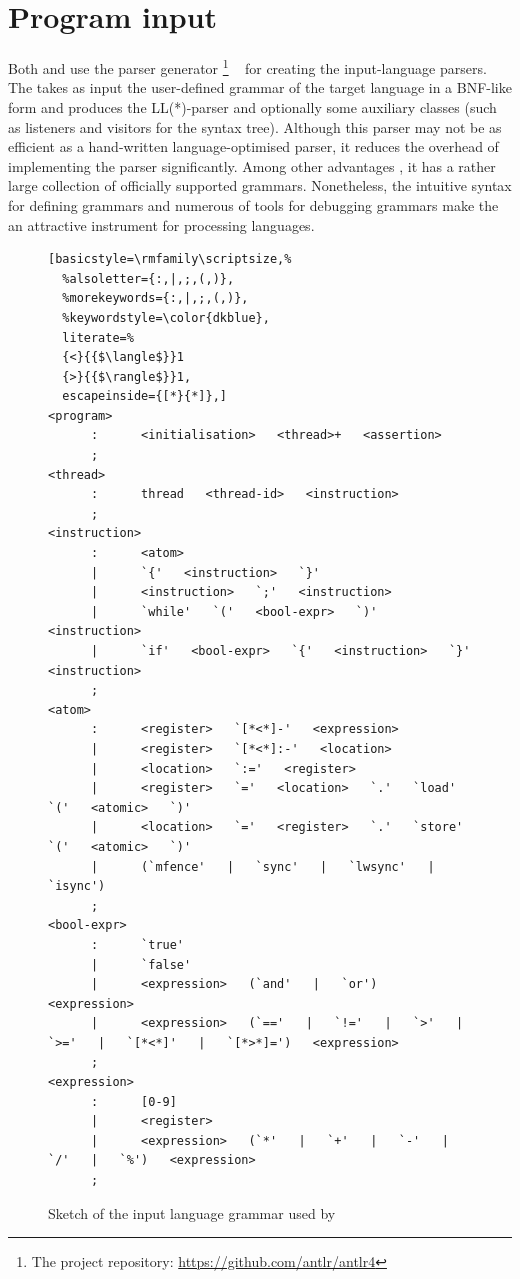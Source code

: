 \section{Program input}
\label{ch:impl:input}

Both \porthos[1] and \porthos[2] use the  parser generator%
%
\footnote{The  project repository: \url{https://github.com/antlr/antlr4}}%
%
~\cite{parr2013definitive} for creating the input-language parsers.
The  takes as input the user-defined grammar of the target language in a BNF-like form and produces the LL(*)-parser and optionally some auxiliary classes (such as listeners and visitors for the syntax tree).
Although this parser may not be as efficient as a hand-written language-optimised parser, it reduces the overhead of implementing the parser significantly.
Among other advantages , it has a rather large collection of officially supported grammars.
Nonetheless, the intuitive syntax for defining grammars and numerous of tools for debugging grammars make the  an attractive instrument for processing languages.

\begin{figure}[t]%
\centering
\begin{lstlisting}[basicstyle=\rmfamily\scriptsize,%
  %alsoletter={:,|,;,(,)},
  %morekeywords={:,|,;,(,)},
  %keywordstyle=\color{dkblue},
  literate=%
  {<}{{$\langle$}}1
  {>}{{$\rangle$}}1,
  escapeinside={[*}{*]},]
<program>
      :      <initialisation>   <thread>+   <assertion>
      ;
<thread>
      :      thread   <thread-id>   <instruction>
      ;
<instruction>
      :      <atom>
      |      `{'   <instruction>   `}'
      |      <instruction>   `;'   <instruction>
      |      `while'   `('   <bool-expr>   `)'   <instruction>
      |      `if'   <bool-expr>   `{'   <instruction>   `}'   <instruction>
      ;
<atom>   
      :      <register>   `[*<*]-'   <expression>
      |      <register>   `[*<*]:-'   <location>
      |      <location>   `:='   <register>
      |      <register>   `='   <location>   `.'   `load'    `('   <atomic>   `)'
      |      <location>   `='   <register>   `.'   `store'   `('   <atomic>   `)'
      |      (`mfence'   |   `sync'   |   `lwsync'   |   `isync')
      ;
<bool-expr>
      :      `true'
      |      `false'
      |      <expression>   (`and'   |   `or')   <expression>
      |      <expression>   (`=='   |   `!='   |   `>'   |   `>='   |   `[*<*]'   |   `[*>*]=')   <expression>
      ;
<expression>
      :      [0-9]
      |      <register>
      |      <expression>   (`*'   |   `+'   |   `-'   |   `/'   |   `%')   <expression>
      ;
\end{lstlisting}
\caption{Sketch of the input language grammar used by \oldporthos{}}
\label{fig:in_grammar_pts}
\end{figure}

